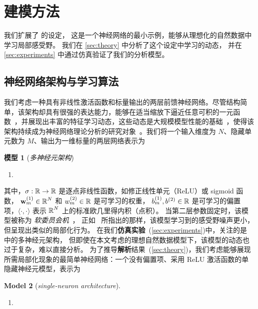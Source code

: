 \section{建模方法}
\label{sec:prelims}

我们扩展了 \textcite{ingrosso2022data} 的设定，
这是一个神经网络的最小示例，能够从理想化的自然数据中学习局部感受野。
我们在 \cref{sec:theory} 中分析了这个设定中学习的动态，
并在 \cref{sec:experiments} 中通过仿真验证了我们的分析模型。
\subsection{神经网络架构与学习算法}
\label{sec:model}

我们考虑一种具有非线性激活函数和标量输出的两层前馈神经网络。尽管结构简单，该架构却具有很强的表达能力，能够在适当缩放下逼近任意可积的一元函数~\parencite{barron1993universal, pinkus1999approximation}，并展现出丰富的特征学习动态，这些动态是大规模模型性能的基础~\parencite{woodworth2020kernel}，使得该架构持续成为神经网络理论分析的研究对象~\parencite{mei2018mean, goldt2019dynamics, veiga2022phase}。我们将一个输入维度为 $N$、隐藏单元数为 $M$、输出为一维标量的两层网络表示为
\begin{model}{\textbf{模型 1} (\emph{多神经元架构})}{}
\begin{enumerate}[series=modelenumi]
  \item \label{item:many-neuron-model}
\end{enumerate}
\end{model}
其中，$\sigma : \operatorname{\mathbb{R}} \to \operatorname{\mathbb{R}}$ 是逐点非线性函数，如修正线性单元（ReLU）或 sigmoid 函数，
$\mathbf{w}_m^{(1)} \in \operatorname{\mathbb{R}}^N$ 和 $w_m^{(2)} \in \operatorname{\mathbb{R}}$ 是可学习的权重，
$b_m^{(1)}, b^{(2)} \in \operatorname{\mathbb{R}}$ 是可学习的偏置项，$\langle \cdot, \cdot \rangle$ 表示 $\operatorname{\mathbb{R}}^N$ 上的标准欧几里得内积（点积）。
当第二层参数固定时，该模型被称为 \emph{软委员会机}~\parencite[SCM;][]{saad1995line}，
正如~\parencite{ingrosso2022data} 所指出的那样，该模型学习到的感受野噪声更小，但呈现出类似的局部化行为。
在我们\textbf{仿真实验}~(\cref{sec:experiments})中，关注的是  中的多神经元架构，
但即使在本文考虑的理想自然数据模型下，该模型的动态也过于复杂，难以直接分析。
为了推导\textbf{解析}结果~(\cref{sec:theory})，我们考虑能够展现所需局部化现象的最简单神经网络：一个没有偏置项、采用 ReLU 激活函数的单隐藏神经元模型，表示为
\begin{model}{\textbf{Model 2} (\emph{single-neuron architecture}).}{}
\begin{enumerate}[resume*=modelenumi]
  \item \label{item:single-neuron-model}
\end{enumerate}
\end{model}
